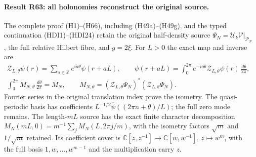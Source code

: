 \paragraph{Result R63: all holonomies reconstruct the original source.}
The complete proof (H1)--(H66), including (H49a)--(H49g), and the
typed continuation (HDI1)--(HDI24) retain the original half-density
source $\Psi_N=\mathcal U_k\mathcal V|_{\mathcal P_N}$, the full
relative Hilbert fibre, and $g=2\xi$. For $L>0$ the exact map and
inverse are
\[
\begin{gathered}
 \mathcal Z_{L,\theta}\psi(r)=
       \sum_{a\in\mathbb Z}e^{ia\theta}\psi(r+aL),\qquad
 \psi(r+aL)=\int_0^{2\pi}e^{-ia\theta}
       \mathcal Z_{L,\theta}\psi(r)\,\frac{d\theta}{2\pi},\\
 \int_0^{2\pi}M_{N,\theta}\,\frac{d\theta}{2\pi}=M_N,
 \qquad M_{N,\theta}=(\mathcal Z_{L,\theta}\Psi_N)^*
                             (\mathcal Z_{L,\theta}\Psi_N).
\end{gathered}
\]
Fourier series in the original translation index prove the isometry.
The quasi-periodic basis has coefficients
$L^{-1/2}\widehat\psi((2\pi n+\theta)/L)$; the full zero mode
remains. The length-$mL$ source has the exact finite character
decomposition $M_N(mL,0)=m^{-1}\sum_jM_N(L,2\pi j/m)$,
with the isometry factors $\sqrt m$ and $1/\sqrt m$ retained.
Its coefficient cover is $\mathbb C[z,z^{-1}]\to
\mathbb C[w,w^{-1}]$, $z\mapsto w^m$, with the full basis
$1,w,\ldots,w^{m-1}$ and the multiplication carry $z$.

